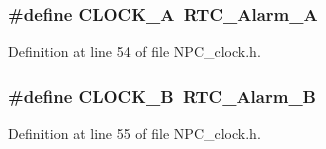\subsubsection[{\texorpdfstring{C\+L\+O\+C\+K\+\_\+A}{CLOCK_A}}]{\setlength{\rightskip}{0pt plus 5cm}\#define C\+L\+O\+C\+K\+\_\+A~R\+T\+C\+\_\+\+Alarm\+\_\+A}\hypertarget{group___c_l_o_c_k___choice_gaa6850d52f4718938783dcc4b932f78ac}{}\label{group___c_l_o_c_k___choice_gaa6850d52f4718938783dcc4b932f78ac}


Definition at line 54 of file N\+P\+C\+\_\+clock.\+h.

\subsubsection[{\texorpdfstring{C\+L\+O\+C\+K\+\_\+B}{CLOCK_B}}]{\setlength{\rightskip}{0pt plus 5cm}\#define C\+L\+O\+C\+K\+\_\+B~R\+T\+C\+\_\+\+Alarm\+\_\+B}\hypertarget{group___c_l_o_c_k___choice_gaa955d6afa2e3fcc5dc68064b9cd5161f}{}\label{group___c_l_o_c_k___choice_gaa955d6afa2e3fcc5dc68064b9cd5161f}


Definition at line 55 of file N\+P\+C\+\_\+clock.\+h.

